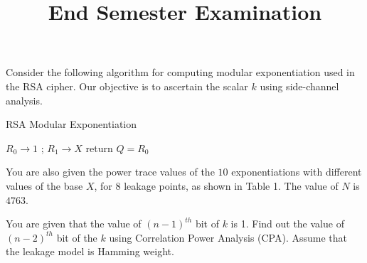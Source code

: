 \documentclass{article}
\title{End Semester Examination}
\begin{document}
\vspace*{-0.3in}
\begin{questions}

\question 

Consider the following algorithm for computing 
modular exponentiation used in the RSA cipher. 
Our objective is to ascertain the scalar $k$ using 
side-channel analysis.\\

\begin{algorithm}[H]

   \caption{RSA Modular Exponentiation}
   \label{algo:2}
   
{$R_0 \rightarrow 1$ ; $R_1 \rightarrow X$ \; }
{return $Q=R_0$ \; }
   
  \end{algorithm}
  
You are also given the power trace values of the $10$ exponentiations with different values of the 
base $X$, for 8 leakage points, as shown in Table 1. The value of $N$ is $4763$. 

You are given that the value of $(n-1)^{th}$ bit of $k$ is 1. Find out the value of $(n-2)^{th}$ bit of the $k$ using {\sf Correlation Power Analysis} (CPA). Assume that the leakage model is Hamming weight.


\end{questions}
\end{document}

